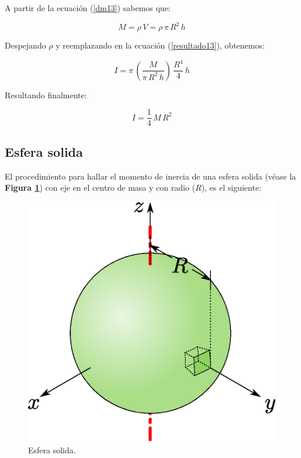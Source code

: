 \documentclass[letter,oneside,11pt]{article}
\begin{document}
A partir de la ecuación (\ref{dm13}) sabemos que:

\begin{equation*}
    M = \rho\, V = \rho\, \pi\, R^2\, h
\end{equation*}

Despejando $\rho$ y reemplazando en la ecuación (\ref{resultado13}), obtenemos:

\begin{equation*}
    I = \pi\, (\frac{M}{\pi\, R^2\, h})\, \frac{R^4}{4}\, h
\end{equation*}

Resultando finalmente:

\begin{equation}
    I = \frac{1}{4}\, M\, R^2
\end{equation}

\subsection{Esfera solida}
El procedimiento para hallar el momento de inercia de una esfera solida
(véase la \textbf{Figura \ref{figura21}}) con eje en el centro de masa y con
radio ($R$), es el siguiente:

\begin{figure}
\centering
\includegraphics[scale=0.5]{resources/f21.eps}
\caption{Esfera solida.}
\label{figura21}
\end{figure}
\end{document}
